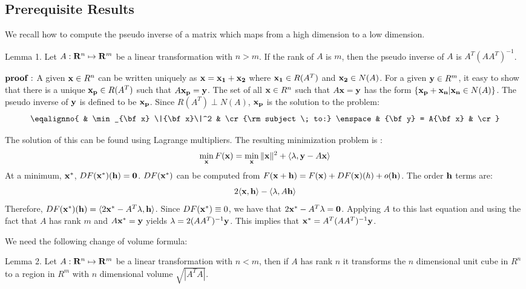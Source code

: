 \smallskip

\subsection{Prerequisite Results}
We recall how to compute the pseudo inverse of a matrix which maps from 
a high dimension to a low dimension.

\proclaim Lemma 1. Let $A : {\bf R}^n \mapsto {\bf R}^m$ be a linear 
transformation with $n > m$. If the rank of $A$ is $m$, then the pseudo 
inverse of $A$ is $A^T (AA^T)^{-1}$.

${\bf proof:}$ A given ${\bf x} \in R^n$ can be written uniquely 
as ${\bf x} = {\bf x_1} + {\bf x_2}$ 
where ${\bf x_1} \in R(A^T)$ and ${\bf x_2} \in N(A)$. For a given 
${\bf y} \in R^m$, it easy to show that there is a unique 
${\bf x_p} \in R(A^T)$ such that 
$A {\bf x_p} = {\bf y}$. The set of all ${\bf x} \in R^n$ such that 
$A{\bf x} = {\bf y}$ has the form 
$\{ {\bf x_p + x_n} | {\bf x_n} \in N(A)\}$. The pseudo inverse of ${\bf y}$
is defined to be ${\bf x_p}$. Since $R(A^T) \perp N(A)$, ${\bf x_p}$ is the 
solution to the problem:
$$
\eqalignno{
& \min_{\bf x} \|{\bf x}\|^2 & \cr
{\rm subject \; to:} \enspace & {\bf y} = A{\bf x} & \cr
}
$$

The solution of this can be found using Lagrange multipliers. The resulting
minimization problem is :
$$
\min_{\bf x} F({\bf x}) = \min_{\bf x} \|{\bf x}\|^2 + \langle{\bf \lambda}, {\bf y} - A{\bf x\rangle}
$$
At a minimum, ${\bf x}^*$, $DF({\bf x}^*) ({\bf h}) = {\bf 0}$. 
$DF({\bf x}^*)$ 
can be computed from 
$F({\bf x} + {\bf h}) = F({\bf x}) + DF({\bf x})(h) + o({\bf h})$. The order 
${\bf h}$ terms are:
$$
2\langle{\bf x}, {\bf h}\rangle - \langle{\bf \lambda}, A{\bf h}\rangle
$$
Therefore, $DF({\bf x}^*)({\bf h}) = 
\langle 2 {\bf x}^* - A^T {\bf \lambda}, {\bf h}\rangle$. Since $DF({\bf x}^*) \equiv 0$, we
have that $2 {\bf x}^* - A^T {\bf \lambda} = {\bf 0}$. Applying $A$ to this 
last equation and using the fact that $A$ has rank $m$ and 
$A{\bf x}^* = {\bf y}$ yields ${\bf \lambda} = 2 (A A^T)^{-1} {\bf y}$.
This implies that ${\bf x}^* = A^T (A A^T)^{-1} {\bf y}$.

\bigskip

We need the following change of volume formula:

\proclaim Lemma 2. Let 
$A : {\bf R}^n \mapsto {\bf R}^m$ be a linear 
transformation with $n < m$, then if $A$ has rank $n$ it transforms the 
$n$ dimensional unit cube in $R^n$ to a region in $R^m$ with 
$n$ dimensional volume 
$\sqrt{ |A^T A|}$.

